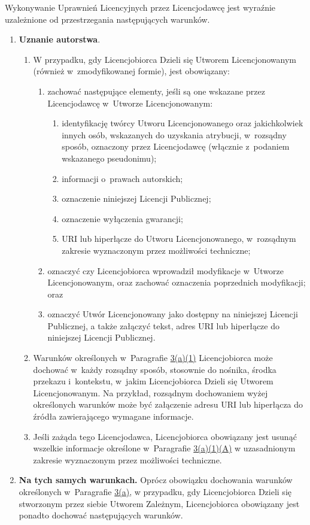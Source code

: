 \documentclass[oneside,polish,11pt,rmheadings]{mwbk}
\begin{document}
Wykonywanie Uprawnień Licencyjnych przez Licencjodawcę jest wyraźnie uzależnione od przestrzegania następujących warunków. 
\begin{enumerate}
\item  
\textbf{{\textmd{Uznanie autorstwa}}}{.} 
	\begin{enumerate}
\item  W przypadku, gdy Licencjobiorca Dzieli się Utworem Licencjonowanym (również w~zmodyfikowanej formie), jest obowiązany: 
	\begin{enumerate}
\item  zachować następujące elementy, jeśli są one wskazane przez Licencjodawcę w~Utworze Licencjonowanym:  
	\begin{enumerate}
\item  identyfikację twórcy Utworu Licencjonowanego oraz jakichkolwiek innych osób, wskazanych do uzyskania atrybucji, w~rozsądny sposób, oznaczony przez Licencjodawcę (włącznie z~podaniem wskazanego pseudonimu);  
\item  informacji o~prawach autorskich;  
\item  oznaczenie niniejszej Licencji Publicznej;  
\item  oznaczenie wyłączenia gwarancji;  
\item  URI lub hiperłącze do Utworu Licencjonowanego, w~rozsądnym zakresie wyznaczonym przez możliwości techniczne;  
	\end{enumerate}
\item  oznaczyć czy Licencjobiorca wprowadził modyfikacje w~Utworze Licencjonowanym, oraz zachować oznaczenia poprzednich modyfikacji; oraz  
\item  oznaczyć Utwór Licencjonowany jako dostępny na niniejszej Licencji Publicznej, a także załączyć tekst, adres URI lub hiperłącze do niniejszej Licencji Publicznej.  			\end{enumerate} 
\item  Warunków określonych w~Paragrafie \href{about:reader?url=https%3A%2F%2Fcreativecommons.org%2Flicenses%2Fby-nc-sa%2F4.0%2Flegalcode.pl#s3a1}{3(a)(1)} 
Licencjobiorca może dochować w~każdy rozsądny sposób, stosownie do nośnika, środka przekazu i~kontekstu, w~jakim Licencjobiorca Dzieli się Utworem Licencjonowanym. Na przykład, rozsądnym dochowaniem wyżej określonych warunków może być załączenie adresu URI lub hiperłącza do źródła zawierającego wymagane informacje.  
\item  Jeśli zażąda tego Licencjodawca, Licencjobiorca obowiązany jest usunąć wszelkie informacje określone w~Paragrafie \href{about:reader?url=https%3A%2F%2Fcreativecommons.org%2Flicenses%2Fby-nc-sa%2F4.0%2Flegalcode.pl#s3a1A}{3(a)(1)(A)} 
w uzasadnionym zakresie wyznaczonym przez możliwości techniczne.  
	\end{enumerate} 
\item  \textbf{{\textmd{Na tych samych warunkach. }}} 
Oprócz obowiązku dochowania warunków określonych w~Paragrafie \href{about:reader?url=https%3A%2F%2Fcreativecommons.org%2Flicenses%2Fby-nc-sa%2F4.0%2Flegalcode.pl#s3a}{3(a)}, 
w przypadku, gdy Licencjobiorca Dzieli się stworzonym przez siebie Utworem Zależnym, Licencjobiorca obowiązany jest ponadto dochować następujących warunków. 


\end{enumerate}
\end{document}

